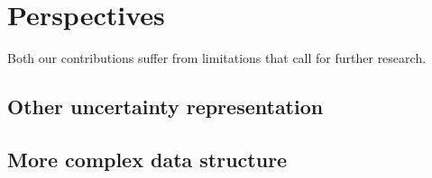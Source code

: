 \section{Perspectives}




Both our contributions suffer from limitations that call for further research.




\subsection{Other uncertainty representation}



\subsection{More complex data structure}


